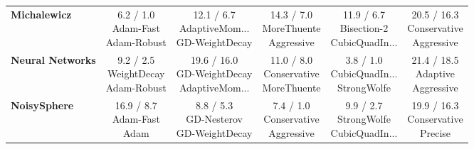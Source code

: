\documentclass{article}
\begin{document}
\begin{longtable}{lccccc}
\textbf{Michalewicz} & \cellcolor{bestgreen!30} \makecell{6.2 / 1.0 \\ \scriptsize{Adam-Fast} \\ \scriptsize{Adam-Robust}}&  \makecell{12.1 / 6.7 \\ \scriptsize{AdaptiveMom...} \\ \scriptsize{GD-WeightDecay}}&  \makecell{14.3 / 7.0 \\ \scriptsize{MoreThuente} \\ \scriptsize{Aggressive}}&  \makecell{11.9 / 6.7 \\ \scriptsize{Bisection-2} \\ \scriptsize{CubicQuadIn...}}& \cellcolor{worstred!20} \makecell{20.5 / 16.3 \\ \scriptsize{Conservative} \\ \scriptsize{Aggressive}} \\
\textbf{Neural Networks} &  \makecell{9.2 / 2.5 \\ \scriptsize{WeightDecay} \\ \scriptsize{Adam-Robust}}&  \makecell{19.6 / 16.0 \\ \scriptsize{GD-WeightDecay} \\ \scriptsize{AdaptiveMom...}}&  \makecell{11.0 / 8.0 \\ \scriptsize{Conservative} \\ \scriptsize{MoreThuente}}& \cellcolor{bestgreen!30} \makecell{3.8 / 1.0 \\ \scriptsize{CubicQuadIn...} \\ \scriptsize{StrongWolfe}}& \cellcolor{worstred!20} \makecell{21.4 / 18.5 \\ \scriptsize{Adaptive} \\ \scriptsize{Aggressive}} \\
\textbf{NoisySphere} &  \makecell{16.9 / 8.7 \\ \scriptsize{Adam-Fast} \\ \scriptsize{Adam}}&  \makecell{8.8 / 5.3 \\ \scriptsize{GD-Nesterov} \\ \scriptsize{GD-WeightDecay}}& \cellcolor{bestgreen!30} \makecell{7.4 / 1.0 \\ \scriptsize{Conservative} \\ \scriptsize{Aggressive}}&  \makecell{9.9 / 2.7 \\ \scriptsize{StrongWolfe} \\ \scriptsize{CubicQuadIn...}}& \cellcolor{worstred!20} \makecell{19.9 / 16.3 \\ \scriptsize{Conservative} \\ \scriptsize{Precise}} \\

\end{longtable}
\end{document}
